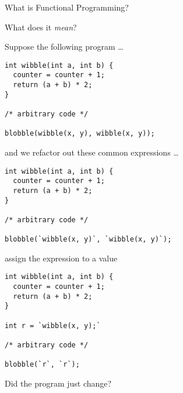 \begin{frame}
\begin{center}
What is Functional Programming?
\end{center}
\begin{center}
What does it \emph{mean}?
\end{center}
\end{frame}

\begin{frame}[fragile]
\begin{block}{Suppose the following program \ldots}
\begin{lstlisting}[style=java]
int wibble(int a, int b) {
  counter = counter + 1;
  return (a + b) * 2;
}

/* arbitrary code */

blobble(wibble(x, y), wibble(x, y));
\end{lstlisting}
\end{block}
\end{frame}

\begin{frame}[fragile]
\begin{block}{and we refactor out these common expressions \ldots}
\begin{lstlisting}[style=java]
int wibble(int a, int b) {
  counter = counter + 1;
  return (a + b) * 2;
}

/* arbitrary code */

blobble(`wibble(x, y)`, `wibble(x, y)`);
\end{lstlisting}
\end{block}
\end{frame}

\begin{frame}[fragile]
\begin{block}{assign the expression to a value}
\begin{lstlisting}[style=java]
int wibble(int a, int b) {
  counter = counter + 1;
  return (a + b) * 2;
}

int r = `wibble(x, y);`

/* arbitrary code */

blobble(`r`, `r`);
\end{lstlisting}
\end{block}
\end{frame}

\begin{frame}[fragile]
\begin{center}
Did the program just change?
\end{center}
\end{frame}

